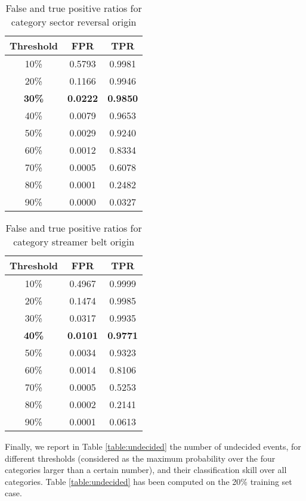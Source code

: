 \documentclass[draft,jgrga]{agutex}
\begin{document}
\begin{article}
\begin{table}
\caption{False and true positive ratios for category sector reversal origin}\label{table:roc_ps}
\centering
\begin{tabular}{c c c}
\hline
Threshold & FPR & TPR\\
\hline
10\% & 0.5793  &  0.9981\\
20\% &    0.1166 &   0.9946\\
\bf{30\%} &    \bf{0.0222} &    \bf{0.9850}\\
40\% &    0.0079 &   0.9653\\
50\% &    0.0029 &   0.9240\\
60\% &    0.0012 &   0.8334\\
70\% &    0.0005 &   0.6078\\
80\% &    0.0001 &   0.2482\\
90\% &    0.0000  &  0.0327\\
\end{tabular}
\end{table}

\begin{table}
\caption{False and true positive ratios for category streamer belt origin}\label{table:roc_st}
\centering
\begin{tabular}{c c c}
\hline
Threshold & FPR & TPR\\
\hline
10\% & 0.4967 &   0.9999\\
20\% &    0.1474 &   0.9985\\
30\% &    0.0317 &   0.9935\\
\bf{40\%} &    \bf{0.0101} &    \bf{0.9771}\\
50\% &    0.0034 &   0.9323\\
60\% &    0.0014 &   0.8106\\
70\% &    0.0005 &   0.5253\\
80\% &    0.0002 &   0.2141\\
90\% &    0.0001 &   0.0613\\
\end{tabular}
\end{table}

{Finally, we report in  Table \ref{table:undecided}  the number of undecided events, for different thresholds (considered as the maximum probability over the four categories larger than a certain number), and their classification skill over all categories. Table \ref{table:undecided} has been computed on the 20\% training set case.}


\end{article}
\end{document}

